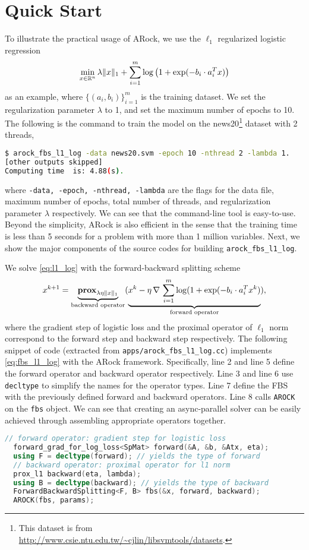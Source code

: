 \section{Quick Start}\label{sec:quick_start}
 To illustrate the practical usage of ARock, we use the $\ell_1$ regularized logistic regression
\begin{equation}\label{eq:l1_log}
\min_{x \in \mathbb{R}^n} \lambda \|x\|_1 + \sum_{i = 1}^m \log\left(1 + \exp(-b_i \cdot a_i^T x)\right)
\end{equation}
as an example, where $\{(a_i, b_i)\}_{i = 1}^m$ is the training dataset. We set the regularization parameter $\lambda$ to 1, and set the maximum number of epochs to 10. The following is the command to train the model on the news20\footnote{ This dataset is from \url{http://www.csie.ntu.edu.tw/~cjlin/libsvmtools/datasets}.} dataset with 2 threads,
\begin{lstlisting}[language=bash]
$ arock_fbs_l1_log -data news20.svm -epoch 10 -nthread 2 -lambda 1.
[other outputs skipped]
Computing time  is: 4.88(s).
\end{lstlisting}
where \texttt{-data, -epoch, -nthread, -lambda} are the flags for the data file, maximum number of epochs, total number of threads, and regularization parameter $\lambda$ respectively. We can see that the command-line tool is easy-to-use. Beyond the simplicity, ARock is also efficient in the sense that the training time is less than 5 seconds for a problem with more than 1 million variables. Next, we show the major components of the source codes for building \texttt{arock\_fbs\_l1\_log}.

We solve \eqref{eq:l1_log} with the forward-backward splitting scheme
\begin{equation}\label{eq:fbs_l1_log}
x^{k+1} = \underbrace{\mathbf{prox}_{\lambda \eta \|x\|_1}}_{\text{backward operator}} (\underbrace{x^k - \eta \, \nabla \,\sum_{i = 1}^m \log (1 + \exp(-b_i \cdot a_i^T x^k)}_{\text{forward operator}}),
\end{equation}  
where the gradient step of logistic loss and the proximal operator of $\ell_1$ norm correspond to the forward step and backward step respectively. The following snippet of code (extracted from \texttt{apps/arock\_fbs\_l1\_log.cc}) implements \eqref{eq:fbs_l1_log} with the ARock framework. Specifically, line 2 and line 5 define the forward operator and backward operator respectively. Line 3 and line 6 use \texttt{decltype} to simplify the names for the operator types. Line 7 define the FBS with the previously defined forward and backward operators. Line 8 calls \texttt{AROCK} on the \texttt{fbs}  object. We can see that creating an async-parallel solver can be easily achieved through assembling appropriate operators together.  
\begin{lstlisting}[language=C++]
  // forward operator: gradient step for logistic loss
  forward_grad_for_log_loss<SpMat> forward(&A, &b, &Atx, eta);
  using F = decltype(forward); // yields the type of forward
  // backward operator: proximal operator for l1 norm 
  prox_l1 backward(eta, lambda);
  using B = decltype(backward); // yields the type of backward
  ForwardBackwardSplitting<F, B> fbs(&x, forward, backward);  
  AROCK(fbs, params);  
\end{lstlisting}